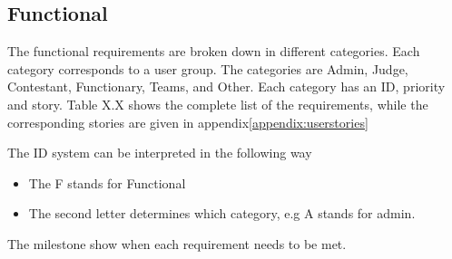 \subsection{Functional}\label{section:functionalreq}
The functional requirements are broken down in different categories.
Each category corresponds to a user group. The categories are Admin, Judge,
Contestant, Functionary, Teams, and Other. Each category has an ID, priority
and story. Table X.X shows the complete list of the requirements, while the
corresponding stories are given in appendix\ref{appendix:userstories}

The ID system can be interpreted in the following way
\begin{itemize}
    \item The F stands for Functional
    \item The second letter determines which category, e.g A stands for admin.
\end{itemize}

The milestone show when each requirement needs to be met.

